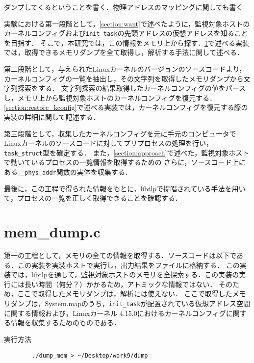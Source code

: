 ダンプしてくるということを書く．物理アドレスのマッピングに関しても書く

実験における第一段階として，\ref{section:want}で述べたように，監視対象ホストのカーネルコンフィグおよび\verb|init_task|の先頭アドレスの仮想アドレスを知ることを目指す．
そこで，本研究では，この情報をメモリ上から探す．\ref{section:mem_dump}で述べる実装では，取得できるメモリダンプを全て取得し，解析する手法に関して述べる．

第二段階として，与えられたLinuxカーネルのバージョンのソースコードより，カーネルコンフィグの一覧を抽出し，その文字列を取得したメモリダンプから文字列探索をする．
文字列探索の結果取得したカーネルコンフィグの値をパースし，メモリ上から監視対象ホストのカーネルコンフィグを復元する．
\ref{section:restore_kconfig}で述べる実装では，カーネルコンフィグを復元する際の実装の詳細に関して記述する．

第三段階として，収集したカーネルコンフィグを元に手元のコンピュータでLinuxカーネルのソースコードに対してプリプロセスの処理を行い，\verb|task_struct|型を確定する．
また，\ref{section:approach}で述べた，監視対象ホストで動いているプロセスの一覧情報を取得するための
さらに，ソースコード上にある\verb|__phys_addr|関数の実体を収集する．

最後に，この工程で得られた情報をもとに，libtlpで提唱されている手法を用いて，プロセスの一覧を正しく取得できることを確認する．

\section{mem\_dump.c}
\label{section:mem_dump}

第一の工程として，メモリの全ての情報を取得する．ソースコードは以下である．この実装を実装ホストで実行し，出力結果をファイルに格納する．
この実装では，libtlpを通して，監視対象ホストのメモリを全探索する．この実装の実行には長い時間（何分？）かかるため，アトミックな情報ではない．
そのため，ここで取得したメモリダンプは，解析には使えない．
ここで取得したメモリダンプは，System.mapのうち，\verb|init_task|が配置されている仮想アドレス空間に関する情報および，Linuxカーネル 4.15.0におけるカーネルコンフィグに関する情報を収集するためのものである．


\begin{itembox}[l]{実行方法}
    \begin{verbatim}
        ./dump_mem > ~/Desktop/work9/dump
    \end{verbatim}
\end{itembox}

